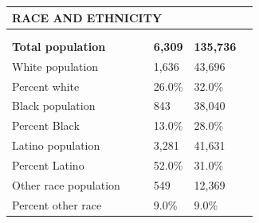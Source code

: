 \documentclass[9pt]{report}
\begin{document}
\vspace{12pt}
\setlength{\tabcolsep}{.01in} %
\begin{tabular}{p{.10in}p{.10in}p{.10in}p{3.7in}>{\hfill}p{.85in}>{\hfill}p{.85in}>{\hfill}p{.85in}>{\hfill}p{.85in}p{0.1in}}
\multicolumn{9}{l}{\parbox{7.1in}{\raggedright{\large{\strut\textbf{RACE AND ETHNICITY}\strut}}}} \\ 
\hline
\multicolumn{4}{l}{\parbox{3.5in}{\raggedright{\textbf{}}}} & \multicolumn{1}{r}{\parbox{.85in}{\strut\raggedleft{\textbf{}\strut}}} & \multicolumn{1}{r}{\parbox{.85in}{\strut\raggedleft{\textbf{}\strut}}} & \multicolumn{1}{r}{\parbox{.85in}{\strut{}}} & \multicolumn{1}{r}{\parbox{.85in}{\strut{}}} & \\ 
\multicolumn{9}{l}{} \\ 
\multicolumn{4}{l}{\parbox{3.5in}{\strut\raggedright{\textbf{Total population}\strut}}} & \textbf{} & \textbf{} & \textbf{6,309} & \textbf{135,736} & \textbf{} \\ 
\multicolumn{4}{l}{\parbox{3.6in}{\strut\raggedright{{White population}}\strut}} &  &  & 1,636 & 43,696 & \multicolumn{1}{l}{}  \\ 
\multicolumn{4}{l}{\parbox{3.6in}{\strut\raggedright{{Percent white}}\strut}} &  &  & 26.0\% & 32.0\% & \multicolumn{1}{l}{}  \\ 
\multicolumn{4}{l}{\parbox{3.6in}{\strut\raggedright{{Black population}}\strut}} &  &  & 843 & 38,040 & \multicolumn{1}{l}{}  \\ 
\multicolumn{4}{l}{\parbox{3.6in}{\strut\raggedright{{Percent Black}}\strut}} &  &  & 13.0\% & 28.0\% & \multicolumn{1}{l}{}  \\ 
\multicolumn{4}{l}{\parbox{3.6in}{\strut\raggedright{{Latino population}}\strut}} &  &  & 3,281 & 41,631 & \multicolumn{1}{l}{}  \\ 
\multicolumn{4}{l}{\parbox{3.6in}{\strut\raggedright{{Percent Latino}}\strut}} &  &  & 52.0\% & 31.0\% & \multicolumn{1}{l}{}  \\ 
\multicolumn{4}{l}{\parbox{3.6in}{\strut\raggedright{{Other race population}}\strut}} &  &  & 549 & 12,369 & \multicolumn{1}{l}{}  \\ 
\multicolumn{4}{l}{\parbox{3.6in}{\strut\raggedright{{Percent other race}}\strut}} &  &  & 9.0\% & 9.0\% & \multicolumn{1}{l}{}  \\ 

\end{tabular}
\setlength{\tabcolsep}{6pt} %
\end{document}
